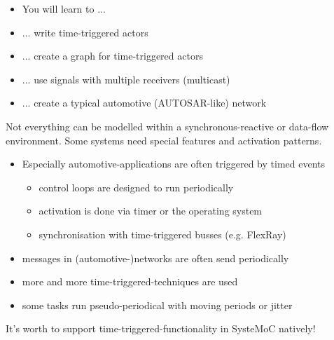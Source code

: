 \begin{frame}
\begin{itemize}
\item You will learn to ...
\item ... write time-triggered actors
\item ... create a graph for time-triggered actors
\item ... use signals with multiple receivers (multicast)
\item ... create a typical automotive (AUTOSAR-like) network
\end{itemize}
\end{frame}




\begin{frame}[fragile=singleslide]
Not everything can be modelled within a synchronous-reactive or data-flow environment. Some systems need special
 features and activation patterns.
\begin{itemize}
\item Especially automotive-applications are often triggered by timed events
	\begin{itemize}
	\item control loops are designed to run periodically
	\item activation is done via timer or the operating system
	\item synchronisation with time-triggered busses (e.g. FlexRay)
	\end{itemize}
\item messages in (automotive-)networks are often send periodically
\item more and more time-triggered-techniques are used
\item some tasks run pseudo-periodical with moving periods or jitter
\end{itemize}
\vspace{5mm}
It's worth to support time-triggered-functionality in SysteMoC natively!
\end{frame}




